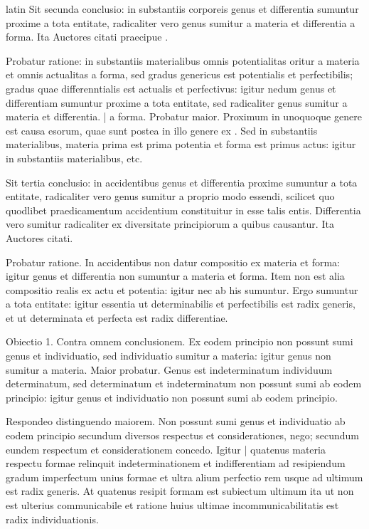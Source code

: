 \begin{otherlanguage*}{latin}
\pstart
Sit secunda conclusio:
in substantiis corporeis genus et differentia sumuntur proxime a tota entitate, radicaliter vero genus sumitur a materia et differentia a forma. Ita Auctores citati praecipue . 
\pend

\pstart
Probatur ratione:
in substantiis materialibus omnis potentialitas oritur a materia et omnis actualitas a forma, sed gradus genericus est potentialis et perfectibilis; gradus quae differenntialis est actualis et perfectivus:
igitur nedum genus et differentiam sumuntur proxime a tota entitate, sed radicaliter genus sumitur a materia et differentia. \textnormal{|} a forma. Probatur maior. Proximum in unoquoque genere est causa esorum, quae sunt postea in illo genere ex . Sed in substantiis materialibus, materia prima est prima potentia et forma est primus actus:
igitur in substantiis materialibus, etc. 
\pend

\pstart
Sit tertia conclusio:
in accidentibus genus et differentia proxime sumuntur a tota entitate, radicaliter vero genus sumitur a proprio modo essendi, scilicet quo quodlibet praedicamentum accidentium constituitur in esse talis entis. Differentia vero sumitur radicaliter ex diversitate principiorum a quibus causantur. Ita Auctores citati. 
\pend

\pstart
Probatur ratione. In accidentibus non datur compositio ex materia et forma:
igitur genus et differentia non sumuntur a materia et forma. Item non est alia compositio realis ex actu et potentia:
igitur nec ab his sumuntur. Ergo sumuntur a tota entitate:
igitur essentia ut determinabilis et perfectibilis est radix generis, et ut determinata et perfecta est radix differentiae. 
\pend

\pstart
Obiectio 1. Contra omnem conclusionem. Ex eodem principio non possunt sumi genus et individuatio, sed individuatio sumitur a materia:
igitur genus non sumitur a materia. Maior probatur. Genus est indeterminatum individuum determinatum, sed determinatum et indeterminatum non possunt sumi ab eodem principio:
igitur genus et individuatio non possunt sumi ab eodem principio. 
\pend

\pstart
Respondeo distinguendo maiorem. Non possunt sumi genus et individuatio ab eodem principio secundum diversos respectus et considerationes, nego; secundum eundem respectum et considerationem concedo. Igitur \textnormal{|} quatenus materia respectu formae relinquit indeterminationem et indifferentiam ad resipiendum gradum imperfectum unius formae et ultra alium perfectio rem usque ad ultimum est radix generis. At quatenus resipit formam est subiectum ultimum ita ut non est ulterius communicabile et ratione huius ultimae incommunicabilitatis est radix individuationis. 
\pend


\end{otherlanguage*}
